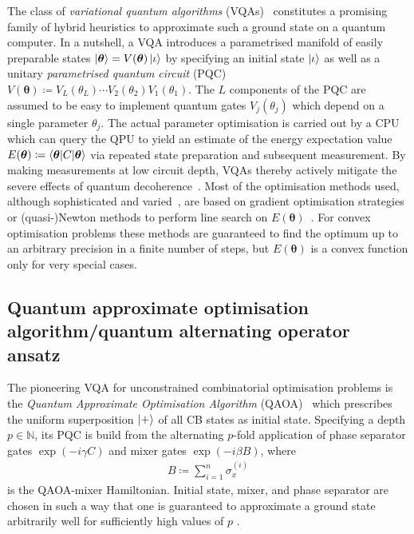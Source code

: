 \documentclass[10pt,conference]{IEEEtran}
\newcommand*{\N}{\mathbb{N}}          %
\begin{document}
The class of \emph{variational quantum algorithms} (VQAs)~\cite{Cerezo2021VariationalQuantumAlgorithms} constitutes a promising family of hybrid heuristics to approximate such a ground state on a quantum computer.
In a nutshell, a VQA introduces a parametrised manifold of easily preparable states $\ket{\bm{\theta}} = V(\bm{\theta}) \ket{\iota}$ by specifying an initial state $\ket{\iota}$ as well as a unitary \emph{parametrised quantum circuit} (PQC) $V(\bm{\theta}) \coloneqq V_{L}(\theta_{L}) \cdots V_{2}(\theta_{2}) V_{1}(\theta_{1})$.
The $L$ components of the PQC are assumed to be easy to implement quantum gates $V_{j}(\theta_{j})$ which depend on a single parameter $\theta_{j}$.
The actual parameter optimisation is carried out by a CPU which can query the QPU to yield an estimate of the energy expectation value $E(\bm{\theta}) \coloneqq \braket{\bm{\theta} | C | \bm{\theta}}$ via repeated state preparation and subsequent measurement.
By making measurements at low circuit depth, VQAs thereby actively mitigate the severe effects of quantum decoherence~\cite{Brandt1999QubitDevicesAndTheIssueOfQuantumDecoherence}.
Most of the optimisation methods used, although sophisticated and varied~\cite{Kuebler2020AnAdaptiveOptimizerForMeasurementFrugalVariationalAlgorithms}, are based on gradient optimisation strategies or (quasi-)Newton methods to perform line search on $E(\bm{\theta})$~\cite{BonetMonroig2023PerformanceComparisonOfOptimizationMethodsOnVariationalQuantumAlgorithms}.
For convex optimisation problems these methods are guaranteed to find the optimum up to an arbitrary precision in a finite number of steps, but $E(\bm{\theta})$ is a convex function only for very special cases.


\subsection{\label{subsection:QuantumApproximateOptimisationAlgorithm}Quantum approximate optimisation algorithm/quantum alternating operator ansatz}

The pioneering VQA for unconstrained combinatorial optimisation problems is the \emph{Quantum Approximate Optimisation Algorithm} (QAOA)~\cite{Farhi2014AQuantumApproximateOptimizationAlgorithm} which prescribes the uniform superposition $\ket{+}$ of all CB states as initial state.
Specifying a depth $p \in \N$, its PQC is build from the alternating $p$-fold application of phase separator gates $\exp(-i \gamma C)$ and mixer gates $\exp(-i \beta B)$, where
\begin{align}\label{equation:QAOAMixerHamiltonian}
    B \coloneqq \sum_{i = 1}^{n} \sigma_{x}^{(i)}
\end{align}
is the QAOA-mixer Hamiltonian.
Initial state, mixer, and phase separator are chosen in such a way that one is guaranteed to approximate a ground state arbitrarily well for sufficiently high values of $p$ \cite{Binkowski2024ElementaryProofOfQaoaConvergence}.
\end{document}
